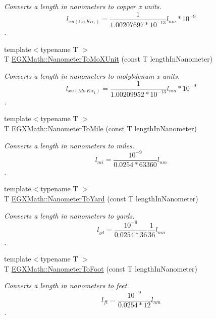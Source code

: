 \begin{DoxyCompactItemize}
\begin{DoxyCompactList}\small\item\em Converts a length in nanometers to copper x units. \[ l_{xu(Cu\ K\alpha_1)}= \frac{1}{1.00207697*10^{-13}} l_{nm} * 10^{-9}\]. \end{DoxyCompactList}\item 
{\footnotesize template$<$typename T $>$ }\\T \mbox{\hyperlink{group___e_g_x_math-_conversions-_length_conversions-_s_i-_nanometer-_non-_s_i_gacc6d7fa95c35687718c816df3c95c7b5}{E\+G\+X\+Math\+::\+Nanometer\+To\+Mo\+X\+Unit}} (const T length\+In\+Nanometer)
\begin{DoxyCompactList}\small\item\em Converts a length in nanometers to molybdenum x units. \[ l_{xu(Mo\ K\alpha_1)}=\frac{1}{1.00209952*10^{-13}} l_{nm} * 10^{-9}\]. \end{DoxyCompactList}\item 
{\footnotesize template$<$typename T $>$ }\\T \mbox{\hyperlink{group___e_g_x_math-_conversions-_length_conversions-_s_i-_nanometer-_imperial_gadbf1e269e14b8afcd128aa5534f28a5e}{E\+G\+X\+Math\+::\+Nanometer\+To\+Mile}} (const T length\+In\+Nanometer)
\begin{DoxyCompactList}\small\item\em Converts a length in nanometers to miles. \[ l_{mi}=\frac{10^{-9}}{0.0254 * 63360} l_{nm} \]. \end{DoxyCompactList}\item 
{\footnotesize template$<$typename T $>$ }\\T \mbox{\hyperlink{group___e_g_x_math-_conversions-_length_conversions-_s_i-_nanometer-_imperial_ga1f2313a0bf1527690778a6dace0db853}{E\+G\+X\+Math\+::\+Nanometer\+To\+Yard}} (const T length\+In\+Nanometer)
\begin{DoxyCompactList}\small\item\em Converts a length in nanometers to yards. \[ l_{yd}= \frac{10^{-9}}{0.0254 * 36} \frac{1}{36} l_{nm} \]. \end{DoxyCompactList}\item 
{\footnotesize template$<$typename T $>$ }\\T \mbox{\hyperlink{group___e_g_x_math-_conversions-_length_conversions-_s_i-_nanometer-_imperial_ga7c6124e07aa11d37695c96c5a520197d}{E\+G\+X\+Math\+::\+Nanometer\+To\+Foot}} (const T length\+In\+Nanometer)
\begin{DoxyCompactList}\small\item\em Converts a length in nanometers to feet. \[ l_{ft}= \frac{10^{-9}}{0.0254 * 12} l_{nm} \]. \end{DoxyCompactList}\item 

\end{DoxyCompactItemize}
